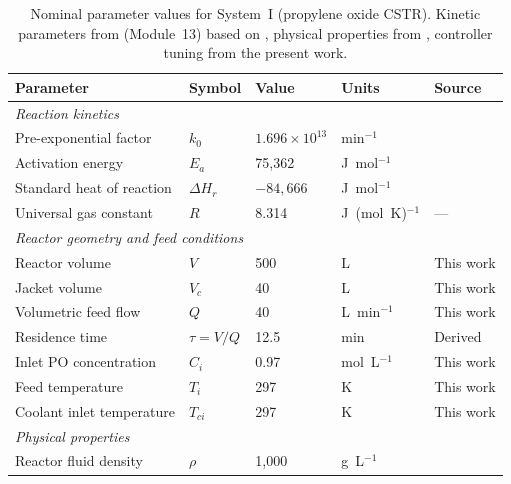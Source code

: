 \documentclass[aps,pre,twocolumn,superscriptaddress]{revtex4-2}
\begin{document}
\begin{table}[t]
\centering
\caption{Nominal parameter values for System~I (propylene oxide
  CSTR). Kinetic parameters from \citet{Fogler2016}
  (Module~13) based on \citet{Furusawa1969}, physical properties from
  \citet{PerrysHandbook}, controller tuning from the present work.}
\label{tab:params_system1}
\small
\begin{tabular}{lllll}
\toprule
Parameter & Symbol & Value & Units & Source \\
\hline
\midrule
\multicolumn{5}{l}{\textit{Reaction kinetics}} \\
Pre-exponential factor     & $k_0$          & $1.696\times10^{13}$ & min$^{-1}$            & \citet{Fogler2016} \\
Activation energy          & $E_a$          & 75{,}362             & J~mol$^{-1}$          & \citet{Fogler2016} \\
Standard heat of reaction  & $\Delta H_r$   & $-84{,}666$          & J~mol$^{-1}$          & \citet{Fogler2016,Ziyai2022} \\
Universal gas constant     & $R$            & 8.314                & J~(mol~K)$^{-1}$      & — \\
\midrule
\multicolumn{5}{l}{\textit{Reactor geometry and feed conditions}} \\
Reactor volume             & $V$            & 500                  & L                     & This work \\
Jacket volume              & $V_c$          & 40                   & L                     & This work \\
Volumetric feed flow       & $Q$            & 40                   & L~min$^{-1}$          & This work \\
Residence time             & $\tau = V/Q$   & 12.5                 & min                   & Derived \\
Inlet PO concentration     & $C_i$          & 0.97                 & mol~L$^{-1}$          & This work \\
Feed temperature           & $T_i$          & 297                  & K                     & This work \\
Coolant inlet temperature  & $T_{ci}$       & 297                  & K                     & This work \\
\midrule
\multicolumn{5}{l}{\textit{Physical properties}} \\
Reactor fluid density      & $\rho$         & 1{,}000              & g~L$^{-1}$            & \citet{PerrysHandbook} \\

\end{tabular}
\end{table}
\end{document}

